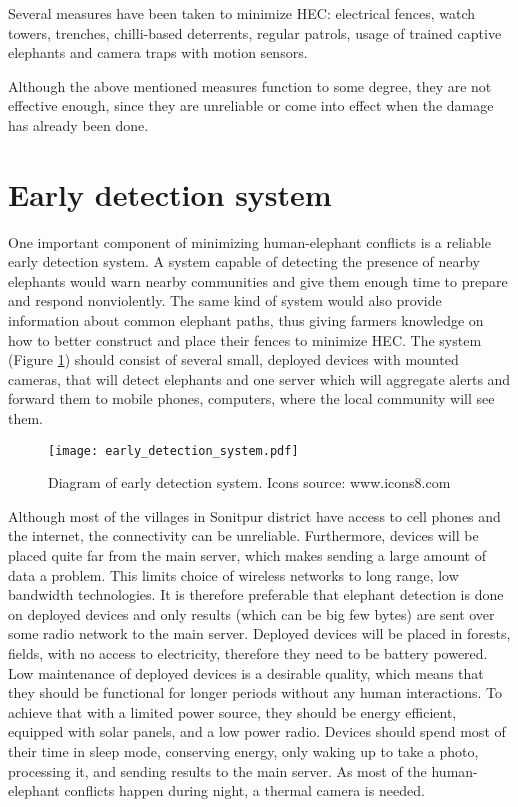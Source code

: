 Several measures have been taken to minimize HEC: electrical fences, watch towers, trenches, chilli-based deterrents, regular patrols, usage of trained captive elephants and camera traps with motion sensors.

Although the above mentioned measures function to some degree, they are not effective enough, since they are unreliable or come into effect when the damage has already been done\cite{wildlabs}. 

\section{ Early detection system}

One important component of minimizing human-elephant conflicts is a reliable early detection system. 
A system capable of detecting the presence of nearby elephants would warn nearby communities and give them enough time to prepare and respond nonviolently.
The same kind of system would also provide information about common elephant paths, thus giving farmers knowledge on how to better construct and place their fences to minimize HEC.
The system (Figure \ref{early_detection_system}) should consist of several small, deployed devices with mounted cameras, that will detect elephants and one server which will aggregate alerts and forward them to mobile phones, computers, where the local community will see them.

\begin{figure}[ht]
        \centering
        \texttt{[image: early\_detection\_system.pdf]} 
        \caption{Diagram of early detection system. Icons source: www.icons8.com}
        \label{early_detection_system}
\end{figure}

Although most of the villages in Sonitpur district have access to cell phones and the internet, the connectivity can be unreliable\cite{wildlabs-elephants}. 
Furthermore, devices will be placed quite far from the main server, which makes sending a large amount of data a problem. 
This limits choice of wireless networks to long range, low bandwidth technologies.
It is therefore preferable that elephant detection is done on deployed devices and only results (which can be big few bytes) are sent over some radio network to the main server.
Deployed devices will be placed in forests, fields, with no access to electricity, therefore they need to be battery powered.
Low maintenance of deployed devices is a desirable quality, which means that they should be functional for longer periods without any human interactions.
To achieve that with a limited power source, they should be energy efficient, equipped with solar panels, and a low power radio.
Devices should spend most of their time in sleep mode, conserving energy, only waking up to take a photo, processing it, and sending results to the main server.
As most of the human-elephant conflicts happen during night\cite{wildlabs-elephants}, a thermal camera is needed.

